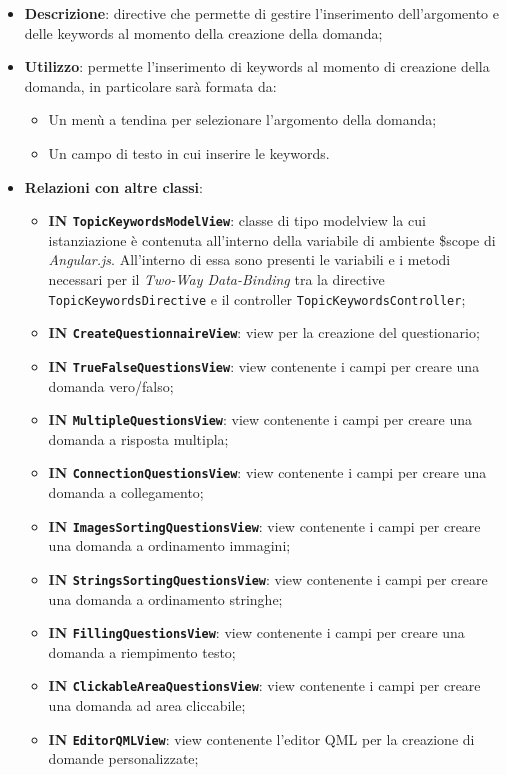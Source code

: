 \begin{itemize}
	\item \textbf{Descrizione}: directive che permette di gestire l'inserimento dell'argomento e delle keywords al momento della creazione della domanda;
	\item \textbf{Utilizzo}: permette l'inserimento di keywords al momento di creazione della domanda, in particolare sarà formata da:
	\begin{itemize}
		\item Un menù a tendina per selezionare l'argomento della domanda;
		\item Un campo di testo in cui inserire le keywords.
	\end{itemize}
	\item \textbf{Relazioni con altre classi}:
	\begin{itemize}
		\item \textbf{IN \texttt{TopicKeywordsModelView}}: classe di tipo modelview la cui istanziazione è contenuta all'interno della variabile di ambiente \$scope di \textit{Angular.js}. All'interno di essa sono presenti le variabili e i metodi necessari per il \textit{Two-Way Data-Binding} tra la directive \texttt{TopicKeywordsDirective} e il controller \texttt{TopicKeywordsController};
		\item \textbf{IN \texttt{CreateQuestionnaireView}}: view per la creazione del questionario; 
		\item \textbf{IN \texttt{TrueFalseQuestionsView}}: view contenente i campi per creare una domanda vero/falso; 
		\item \textbf{IN \texttt{MultipleQuestionsView}}: view contenente i campi per creare una domanda a risposta multipla;
		\item \textbf{IN \texttt{ConnectionQuestionsView}}: view contenente i campi per creare una domanda a collegamento;
		\item \textbf{IN \texttt{ImagesSortingQuestionsView}}: view contenente i campi per creare una domanda a ordinamento immagini;
		\item \textbf{IN \texttt{StringsSortingQuestionsView}}: view contenente i campi per creare una domanda a ordinamento stringhe;
		\item \textbf{IN \texttt{FillingQuestionsView}}: view contenente i campi per creare una domanda a riempimento testo;
		\item \textbf{IN \texttt{ClickableAreaQuestionsView}}: view contenente i campi per creare una domanda ad area cliccabile;
		\item \textbf{IN \texttt{EditorQMLView}}: view contenente l'editor QML per la creazione di domande personalizzate;

\end{itemize}
\end{itemize}
